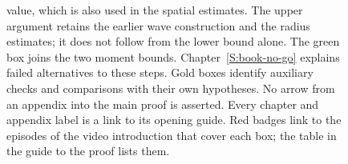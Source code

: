 \begin{figure}
{    value, which is also used in the spatial estimates. The upper argument
    retains the earlier wave construction and the radius estimates; it does
    not follow from the lower bound alone. The green box joins the two moment
    bounds. Chapter~\ref{S:book-no-go} explains failed alternatives to these steps.
    Gold boxes identify auxiliary checks and comparisons with their
    own hypotheses. No arrow from an appendix into the main proof is asserted.
    Every chapter and appendix label is a link to its opening guide. Red badges
    link to the episodes of the video introduction that cover each box; the
    table in the guide to the proof lists them.}
  \label{Fig:chapter-roadmap}
\end{figure}
